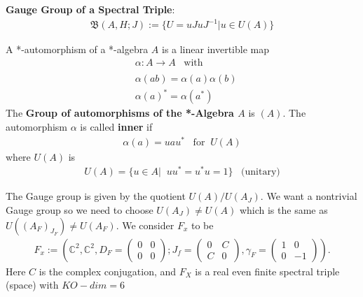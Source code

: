 \textbf{Gauge Group of a Spectral Triple}:
\begin{align}
    \mathfrak{B}(A, H; J) := \{ U = uJuJ^{-1} | u\in U(A)\}
\end{align}
\begin{definition}
    A *-automorphism of a *-algebra $A$ is a linear invertible
    map
    \begin{align}
        &\alpha:A \rightarrow A\;\;\; \text{with}\\
        \nonumber\\
        &\alpha(ab) = \alpha(a)\alpha(b)\\
        &\alpha(a)^* = \alpha(a^*)
    \end{align}
    The \textbf{Group of automorphisms of the *-Algebra $A$} is
    $(A)$.\newline
    The automorphism $\alpha$ is called \textbf{inner} if
    \begin{align}
        \alpha(a) = u a u^* \;\;\; \text{for} \;\; U(A)
    \end{align}
    where $U(A)$ is
    \begin{align}
        U(A) = \{ u\in A|\;\; uu^* = u^*u=1\} \;\;\;
        \text{(unitary)}
    \end{align}
\end{definition}
The Gauge group is given by the quotient $U(A)/U(A_J)$.
We want a nontrivial Gauge group so we need to choose $U(A_J) \neq
U(A)$ which is the same as $U((A_F)_{J_F}) \neq
U(A_F)$.
We consider $F_x$ to be
\begin{align}
    F_x := \left(\mathbb{C}^2,\mathbb{C}^2, D_F =\begin{pmatrix}
        0&0\\0&0\end{pmatrix}; J_f =\begin{pmatrix}
    0&C\\C&0\end{pmatrix},
            \gamma_F = \begin{pmatrix}1&0\\0&-1\end{pmatrix}\right).
\end{align}
Here $C$ is the complex conjugation, and $F_X$ is a real even finite
    spectral triple (space) with $KO-dim=6$

